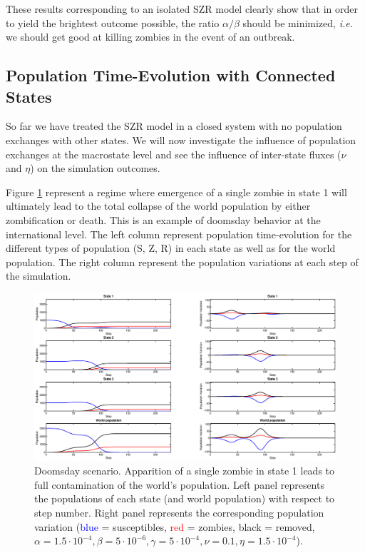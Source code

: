 \documentclass[11pt]{article} %
\begin{document}
These results corresponding to an isolated SZR model clearly show that in order to yield the brightest outcome possible, the ratio $\alpha/\beta$ should be minimized, \textit{i.e.} we should get good at killing zombies in the event of an outbreak.


\subsection{Population Time-Evolution with Connected States}\indent
\label{sec:time-evolv}
 
So far we have treated the SZR model in a closed system with no population exchanges with other states. We will now investigate the influence of population exchanges at the macrostate level and see the influence of inter-state fluxes ($\nu$ and $\eta$) on the simulation outcomes. 

Figure \ref{doomsday} represent a regime where emergence of a single zombie in state 1 will ultimately lead to the total collapse of the world population by either zombification or death. This is an example of doomsday behavior at the international level. The left column represent population time-evolution for the different types of population (S, Z, R) in each state as well as for the world population. The right column represent the population variations at each step of the simulation. 
\begin{figure}[h!]
\centerline{
\includegraphics[scale=0.35]{../images/Matlab_figures/example_doomsday.eps}}
\caption{Doomsday scenario. Apparition of a single zombie in state 1 leads to full contamination of the world's population. Left panel represents the populations of each state (and world population) with respect to step number. Right panel represents the corresponding population variation (\textcolor{blue}{blue} = susceptibles, \textcolor{red}{red} = zombies, black = removed, $\alpha=1.5\cdot10^{-4}, \beta=5\cdot10^{-6}, \gamma=5\cdot10^{-4}, \nu=0.1, \eta=1.5\cdot10^{-4}$). \label{doomsday} }
\end{figure}
\end{document}
